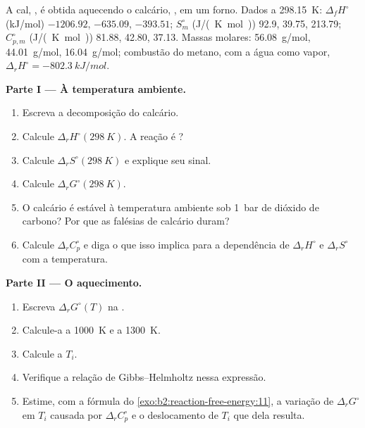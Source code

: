 \begin{problem}
\label{pb:b2:reaction-free-energy:1}
A cal, , é obtida aquecendo o calcário, , em um forno. Dados a
\qty{298.15}{K}: $\Delta_f H^\circ$ (\unit{kJ/mol}) 
$-1206.92$,  $-635.09$,  $-393.51$; $S^\circ_m$
(\unit{J/(K.mol)}) 92.9, 39.75, 213.79; $C^\circ_{p,m}$ (\unit{J/(K.mol)})
81.88, 42.80, 37.13. Massas molares:  \qty{56.08}{g/mol}, 
\qty{44.01}{g/mol},  \qty{16.04}{g/mol}; combustão do metano,
com a água como vapor, $\Delta_r H^\circ = \qty{-802.3}{kJ/mol}$.

\medskip
\noindent\textbf{Parte I --- À temperatura ambiente.}
\begin{enumerate}
  \item Escreva a decomposição do calcário.
  \item Calcule $\Delta_r H^\circ(\qty{298}{K})$. A reação é ?
  \item Calcule $\Delta_r S^\circ(\qty{298}{K})$ e explique seu sinal.
  \item Calcule $\Delta_r G^\circ(\qty{298}{K})$.
  \item O calcário é estável à temperatura ambiente sob \qty{1}{bar} de
        dióxido de carbono? Por que as falésias de calcário duram?
  \item Calcule $\Delta_r C^\circ_p$ e diga o que isso implica para a
        dependência de $\Delta_r H^\circ$ e $\Delta_r S^\circ$ com a temperatura.
\end{enumerate}

\medskip
\noindent\textbf{Parte II --- O aquecimento.}
\begin{enumerate}[resume]
  \item Escreva $\Delta_r G^\circ(T)$ na .
  \item Calcule-a a \qty{1000}{K} e a \qty{1300}{K}.
  \item Calcule a  $T_i$.
  \item Verifique a relação de Gibbs--Helmholtz nessa expressão.
  \item Estime, com a fórmula do \cref{exo:b2:reaction-free-energy:11},
        a variação de $\Delta_r G^\circ$ em $T_i$ causada por
        $\Delta_r C^\circ_p$ e o deslocamento de $T_i$ que dela resulta.
\end{enumerate}


\end{problem}
